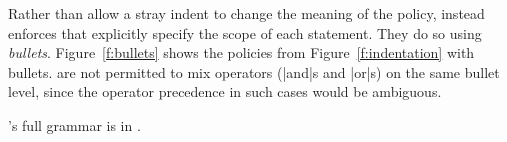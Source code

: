 Rather than allow a stray indent to change the meaning of the policy,
\syslang{} instead enforces that \ces{} explicitly specify the scope of each statement.
%
They do so using \emph{bullets}.
%
Figure~\ref{f:bullets} shows the policies from Figure~\ref{f:indentation} with \syslang{} bullets.
%
\Ces{} are not permitted to mix operators (|and|s and |or|s) on the same bullet level,
since the operator precedence in such cases would be ambiguous.

\syslang{}'s full grammar is in .
